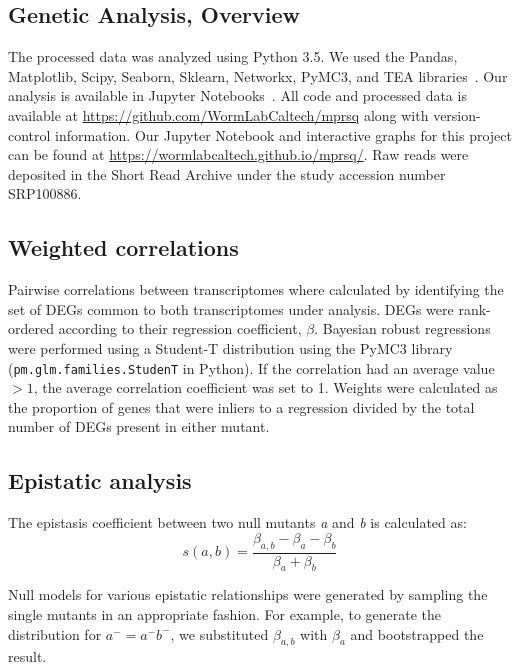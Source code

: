 \documentclass[9pt,twocolumn,twoside,lineno]{pnas-new}
\newcommand{\gene}[1]{\mbox{\emph{#1}}}
\begin{document}
{\subsection*{Genetic Analysis, Overview}
The processed data was analyzed using Python 3.5. We used the Pandas,
Matplotlib, Scipy, Seaborn, Sklearn, Networkx, PyMC3, and TEA
libraries~\cite{McKinney2011,Oliphant2007,
Pedregosa2012,Salvatier2015,VanDerWalt2011,Hunter2007,Angeles-Albores2016,Waskom}.
Our analysis is available in Jupyter Notebooks~\cite{Perez2007}. All code and
processed data is available at
\url{https://github.com/WormLabCaltech/mprsq} along with version-control
information. Our Jupyter Notebook and interactive graphs for this project can be
found at \url{https://wormlabcaltech.github.io/mprsq/}. Raw reads were deposited
in the Short Read Archive under the study accession number SRP100886.

\subsection*{Weighted correlations}
Pairwise correlations between transcriptomes where calculated by identifying the
set of DEGs common to both transcriptomes under
analysis. DEGs were rank-ordered according to their regression coefficient,
$\beta$. Bayesian robust regressions were performed using a Student-T
distribution using the PyMC3 library~\cite{Salvatier2015}
(\texttt{pm.glm.families.StudenT} in Python). If the correlation had an average
value $>1$, the average correlation coefficient was set to 1.
Weights were calculated as the proportion of genes that were inliers to a
regression divided by the total number of DEGs present
in either mutant.

\subsection*{Epistatic analysis}
The epistasis coefficient between two null mutants \gene{a} and \gene{b} is
calculated as:
\begin{equation}
  s(a, b) = \frac{\beta_{a,b} - \beta_a - \beta_b}{\beta_a + \beta_b}
\label{eq:epistasis_coef}
\end{equation}

Null models for various epistatic relationships were generated by sampling the
single mutants in an appropriate fashion. For example, to generate the
distribution for $a^- = a^-b^-$, we substituted $\beta_{a, b}$ with $\beta_a$
and bootstrapped the result.

}
\end{document}

